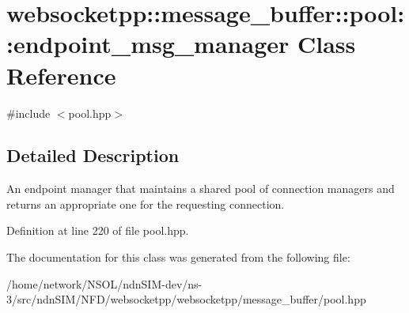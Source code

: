 \hypertarget{classwebsocketpp_1_1message__buffer_1_1pool_1_1endpoint__msg__manager}{}\section{websocketpp\+:\+:message\+\_\+buffer\+:\+:pool\+:\+:endpoint\+\_\+msg\+\_\+manager Class Reference}
\label{classwebsocketpp_1_1message__buffer_1_1pool_1_1endpoint__msg__manager}


{\ttfamily \#include $<$pool.\+hpp$>$}



\subsection{Detailed Description}
An endpoint manager that maintains a shared pool of connection managers and returns an appropriate one for the requesting connection. 

Definition at line 220 of file pool.\+hpp.



The documentation for this class was generated from the following file\+:\begin{DoxyCompactItemize}
\item 
/home/network/\+N\+S\+O\+L/ndn\+S\+I\+M-\/dev/ns-\/3/src/ndn\+S\+I\+M/\+N\+F\+D/websocketpp/websocketpp/message\+\_\+buffer/pool.\+hpp\end{DoxyCompactItemize}
